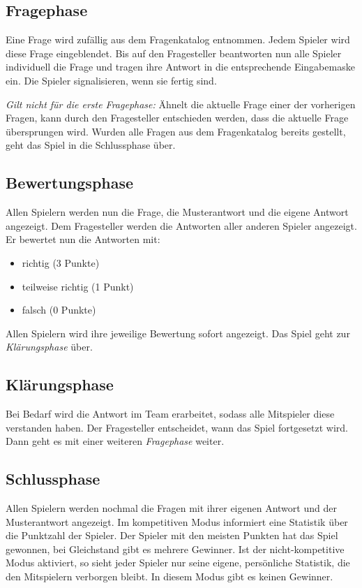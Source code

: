 \documentclass[a4paper,11pt,listof=numbered,glossary=totoc,parskip=half,toc=bib]{scrreprt}
\begin{document}
{\subsection{Fragephase}

Eine Frage wird zufällig aus dem Fragenkatalog entnommen. Jedem Spieler wird diese Frage eingeblendet. Bis auf den Fragesteller beantworten nun alle Spieler individuell die Frage und tragen ihre Antwort in die entsprechende Eingabemaske ein. Die Spieler signalisieren, wenn sie fertig sind.

\textit{Gilt nicht für die erste Fragephase:}
Ähnelt die aktuelle Frage einer der vorherigen Fragen, kann durch den Fragesteller entschieden werden, dass die aktuelle Frage übersprungen wird.
Wurden alle Fragen aus dem Fragenkatalog bereits gestellt, geht das Spiel in die Schlussphase über.

\subsection{Bewertungsphase}

Allen Spielern werden nun die Frage, die Musterantwort und die eigene Antwort angezeigt. Dem Fragesteller werden die Antworten aller anderen Spieler angezeigt. Er bewertet nun die Antworten mit:

\begin{itemize}
	\item richtig (3 Punkte)
	\item teilweise richtig (1 Punkt)
	\item falsch (0 Punkte)
\end{itemize}

Allen Spielern wird ihre jeweilige Bewertung sofort angezeigt. Das Spiel geht zur \textit{Klärungsphase} über.

\subsection{Klärungsphase}

Bei Bedarf wird die Antwort im Team erarbeitet, sodass alle Mitspieler diese verstanden haben. Der Fragesteller entscheidet, wann das Spiel fortgesetzt wird. Dann geht es mit einer weiteren \textit{Fragephase} weiter.

\subsection{Schlussphase}

Allen Spielern werden nochmal die Fragen mit ihrer eigenen Antwort und der Musterantwort angezeigt.
Im kompetitiven Modus informiert eine Statistik über die Punktzahl der Spieler. Der Spieler mit den meisten Punkten hat das Spiel gewonnen, bei Gleichstand gibt es mehrere Gewinner.
Ist der nicht-kompetitive Modus aktiviert, so sieht jeder Spieler nur seine eigene, persönliche Statistik, die den Mitspielern verborgen bleibt. In diesem Modus gibt es keinen Gewinner.

}
\end{document}
